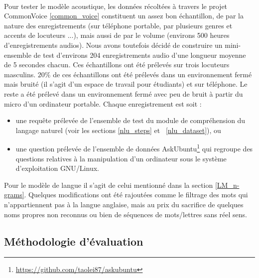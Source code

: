 	\paragraph{}
	Pour tester le modèle acoustique, les données récoltées à travers le projet CommonVoice \ref{common_voice} constituent un assez bon échantillon, de par la nature des enregistrements (sur téléphone portable, par plusieurs genres et accents de locuteurs ...), mais aussi de par le volume (environs 500 heures d'enregistrements audios). Nous avons toutefois décidé de construire un mini-ensemble de test d'environs 204 enregistrements audio d'une longueur moyenne de 5 secondes chacun. Ces échantillons ont été prélevés sur trois locuteurs masculins. $20\%$ de ces échantillons ont été prélevés dans un environnement fermé mais bruité (il s'agit d'un espace de travail pour étudiants) et sur téléphone. Le reste a été prélevé dans un environnement fermé avec peu de bruit à partir du micro d'un ordinateur portable. Chaque enregistrement est soit : 
	\begin{itemize}
		\item une requête prélevée de l'ensemble de test du module de compréhension du langage naturel (voir les sections \ref{nlu_steps} et ~\ref{nlu_dataset}), ou
		
		\item une question prélevée de l'ensemble de données AskUbuntu\footnote{\url{https://github.com/taolei87/askubuntu}} qui regroupe des questions relatives à la manipulation d'un ordinateur sous le système d'exploitation GNU/Linux.
	\end{itemize}
	\par
	Pour le modèle de langue il s'agit de celui mentionné dans la section \ref{LM_n-grams}. Quelques modifications ont été rajoutées comme le filtrage des mots qui n'appartiennent pas à la langue anglaise, mais au prix du sacrifice de quelques noms propres non reconnus ou bien de séquences de mots/lettres sans réel sens.
	\subsection{Méthodologie d'évaluation}
